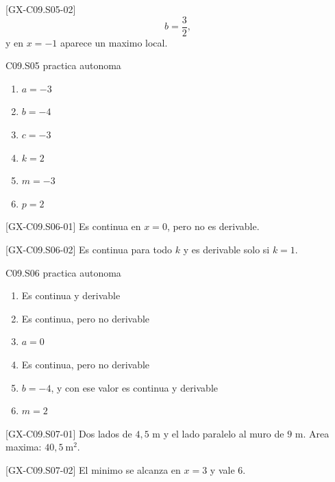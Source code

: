 \begin{shortanswer}{[GX-C09.S05-02]}
\[
b=\frac{3}{2},
\]
y en \(x=-1\) aparece un maximo local.
\end{shortanswer}

\begin{shortanswer}{C09.S05 practica autonoma}
\begin{enumerate}[label=\textbf{PX-C09.S05-\arabic*:}, leftmargin=*]
  \item \(a=-3\)
  \item \(b=-4\)
  \item \(c=-3\)
  \item \(k=2\)
  \item \(m=-3\)
  \item \(p=2\)
\end{enumerate}
\end{shortanswer}

\begin{shortanswer}{[GX-C09.S06-01]}
Es continua en \(x=0\), pero no es derivable.
\end{shortanswer}

\begin{shortanswer}{[GX-C09.S06-02]}
Es continua para todo \(k\) y es derivable solo si \(k=1\).
\end{shortanswer}

\begin{shortanswer}{C09.S06 practica autonoma}
\begin{enumerate}[label=\textbf{PX-C09.S06-\arabic*:}, leftmargin=*]
  \item Es continua y derivable
  \item Es continua, pero no derivable
  \item \(a=0\)
  \item Es continua, pero no derivable
  \item \(b=-4\), y con ese valor es continua y derivable
  \item \(m=2\)
\end{enumerate}
\end{shortanswer}

\begin{shortanswer}{[GX-C09.S07-01]}
Dos lados de \(4{,}5\) m y el lado paralelo al muro de \(9\) m. Area maxima:
\(40{,}5\ \text{m}^2\).
\end{shortanswer}

\begin{shortanswer}{[GX-C09.S07-02]}
El minimo se alcanza en \(x=3\) y vale \(6\).
\end{shortanswer}

